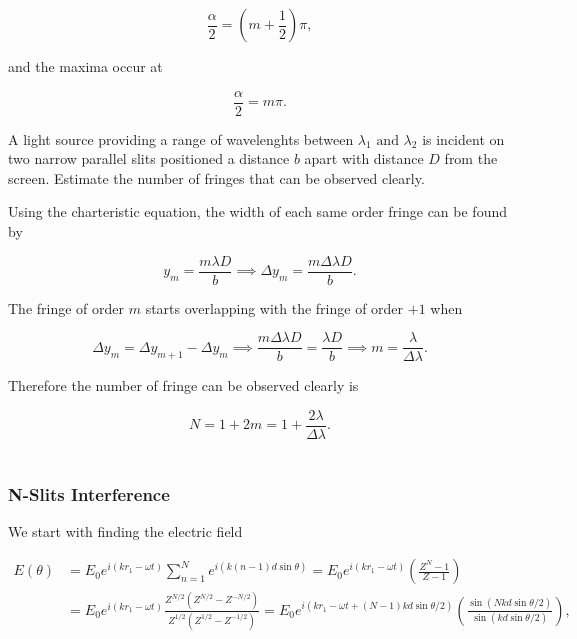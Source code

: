 \documentclass[english,a4paper,12pt]{report}
\begin{document}
\begin{equation}
    \frac{\alpha }{2} = \left(m+\frac{1}{2} \right)\pi , 
\end{equation}

and the maxima occur at 

\begin{equation}
    \frac{\alpha }{2} = m\pi . 
\end{equation}


{A light source providing a range of wavelenghts between \(\lambda _{1} \text { and } \lambda _{2}  \) is incident on two narrow parallel slits positioned a distance \(b\) apart with distance \(D\) from the screen. Estimate the number of fringes that can be observed clearly.}
{Using the charteristic equation, the width of each same order fringe can be found by

\begin{equation}
    y _{m} = \frac{m\lambda D}{b} \implies \Delta y_{m}  =  \frac{m \Delta \lambda D}{b}.
\end{equation}

The fringe of order \(m\) starts overlapping with the fringe of order \(+1\) when 

\begin{equation}
    \Delta y_{m} = \Delta y_{m+1} - \Delta y_{m} \implies \frac{m\Delta \lambda D}{b} = \frac{\lambda D}{b} \implies m = \frac{\lambda }{\Delta \lambda }.      
\end{equation}

Therefore the number of fringe can be observed clearly is 

\begin{equation}
    N = 1+2m = 1+\frac{2\lambda }{\Delta \lambda }. 
\end{equation}
~
} 


\subsubsection{N-Slits Interference}

We start with finding the electric field 

\begin{equation}
    \begin{aligned} 
    E(\theta ) &= E_0 e^{i(kr_1 -\omega t)} \sum_{n=1}^{N} e^{i(k(n-1)d\sin \theta )} = E_0 e^{i(kr_1 - \omega t)} \left( \frac{Z^{N}-1 }{Z-1}  \right) \\
    &= E_0 e^{i(kr_1 -\omega t)} \frac{Z^{N /2}(Z^{N /2} - Z^{-N /2}  ) }{Z^{1 /2} (Z^{1 /2} - Z^{- 1/2}  ) } = E_0 e^{i(kr_1 -\omega t + (N-1)kd\sin \theta /2)} \left( \frac{\sin \left(Nkd\sin \theta /2\right)}{\sin \left( kd\sin \theta /2  \right)}  \right),
    \end{aligned}        
\end{equation}
\end{document}
